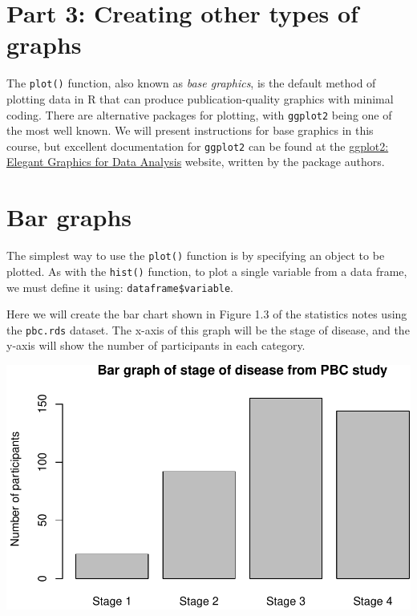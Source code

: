 \documentclass[
]{memoir}
\newenvironment{Shaded}{\begin{snugshade}}{\end{snugshade}}
\newcommand{\AttributeTok}[1]{\textcolor[rgb]{0.77,0.63,0.00}{#1}}
\newcommand{\FunctionTok}[1]{\textcolor[rgb]{0.00,0.00,0.00}{#1}}
\newcommand{\NormalTok}[1]{#1}
\newcommand{\SpecialCharTok}[1]{\textcolor[rgb]{0.00,0.00,0.00}{#1}}
\newcommand{\StringTok}[1]{\textcolor[rgb]{0.31,0.60,0.02}{#1}}
\begin{document}
\hypertarget{part-3-creating-other-types-of-graphs}{%
\section*{Part 3: Creating other types of graphs}\label{part-3-creating-other-types-of-graphs}}

The \texttt{plot()} function, also known as \emph{base graphics}, is the default method of plotting data in R that can produce publication-quality graphics with minimal coding. There are alternative packages for plotting, with \texttt{ggplot2} being one of the most well known. We will present instructions for base graphics in this course, but excellent documentation for \texttt{ggplot2} can be found at the \href{https://ggplot2-book.org/}{ggplot2: Elegant Graphics for Data Analysis} website, written by the package authors.

\hypertarget{bar-graphs}{%
\section{Bar graphs}\label{bar-graphs}}

The simplest way to use the \texttt{plot()} function is by specifying an object to be plotted. As with the \texttt{hist()} function, to plot a single variable from a data frame, we must define it using: \texttt{dataframe\$variable}.

Here we will create the bar chart shown in Figure 1.3 of the statistics notes using the \texttt{pbc.rds} dataset. The x-axis of this graph will be the stage of disease, and the y-axis will show the number of participants in each category.

\begin{Shaded}
\end{Shaded}

\includegraphics{phcm9795-R-notes_files/figure-latex/unnamed-chunk-42-1.pdf}
\end{document}
